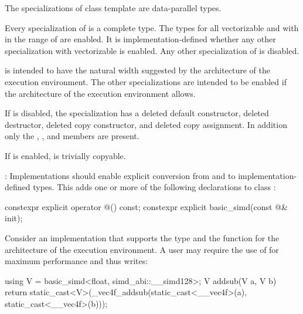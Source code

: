 \pnum
The specializations of class template  are data-parallel types.

\pnum
Every specialization of  is a complete type.
The types  for all vectorizable
 and with  in the range of  are enabled.
It is implementation-defined whether any other  specialization
with vectorizable  is enabled.
Any other specialization of  is disabled.

\begin{note}
   is intended to have the natural width suggested by the architecture of the
  execution environment.
  The other  specializations are intended to be enabled if the
  architecture of the execution environment allows.
\end{note}

If  is disabled, the specialization has a
deleted default constructor, deleted destructor, deleted copy constructor, and
deleted copy assignment.
In addition only the , , and
 members are present.

If  is enabled,  is
trivially copyable.

\pnum\recommended:
Implementations should enable explicit conversion from and to
implementation-defined types. This adds one or more of the following
declarations to class :

\begin{codeblock}
constexpr explicit operator @\impdef@() const;
constexpr explicit basic_simd(const @\impdef@& init);
\end{codeblock}

\begin{example}
  Consider an implementation that supports the type  and the function  for the architecture of the execution environment.
  A user may require the use of  for maximum performance and thus writes:
  \begin{codeblock}
    using V = basic_simd<float, simd_abi::__simd128>;
    V addsub(V a, V b) {
      return static_cast<V>(_vec4f_addsub(static_cast<__vec4f>(a), static_cast<__vec4f>(b)));
    }
  \end{codeblock}
\end{example}


